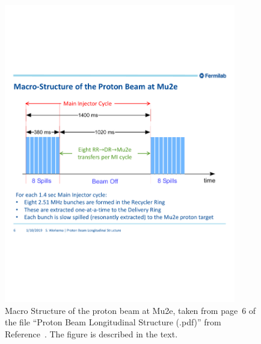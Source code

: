 \begin{figure}[tbp]
\centering
\includegraphics[width=0.9\textwidth]{figures/ProtonBeamLongitudinalStructure2019-01-10_page6.pdf}
\caption[Macro Structure of the Proton Beam at Mu2e]{
  Macro Structure of the proton beam at Mu2e, taken from page~6 of
  the file ``Proton Beam Longitudinal Structure (.pdf)'' from
  Reference~.  The figure is described in the text.}
\label{fig:beamMacroStructure}
\end{figure}

